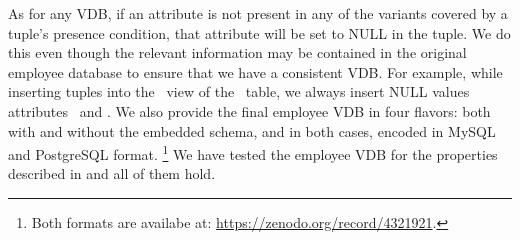 As for any VDB, if an attribute is not present in any of the variants covered
by a tuple's presence condition, that attribute will be set to NULL in the
tuple. We do this even though the relevant information may be contained in the
original employee database to ensure that we have a consistent VDB. For
example, while inserting tuples into the \vFour\ view of the \empbio\ table, we
always insert NULL values attributes \fname\ and \lname.
%
We also provide the final employee VDB in four flavors: both with and without the
embedded schema, and in both cases, encoded in MySQL and PostgreSQL format.%
\footnote{Both formats are availabe at: \url{https://zenodo.org/record/4321921}.} 
%
We have tested the employee  VDB for the properties described in  
and all of them hold.


%
%
%
